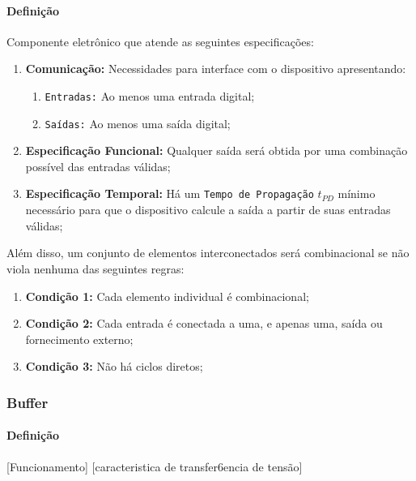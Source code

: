 \documentclass{article}
\begin{document}
            \paragraph{Definição}Componente eletrônico que atende as seguintes especificações:
                \begin{enumerate}[rightmargin = \leftmargin]
                    \item \textbf{Comunicação:} Necessidades para interface com o dispositivo apresentando:
                        \begin{enumerate}[noitemsep]
                            \item \texttt{Entradas:} Ao menos uma entrada digital;
                            \item \texttt{Saídas:} Ao menos uma saída digital;
                        \end{enumerate}

                    \item \textbf{Especificação Funcional:} Qualquer saída será obtida por uma combinação possível das entradas válidas;

                    \item \textbf{Especificação Temporal:} Há um \texttt{Tempo de Propagação} $t_{PD}$ mínimo necessário para que o dispositivo calcule a saída a partir de suas entradas válidas;
                \end{enumerate}
            Além disso, um conjunto de elementos interconectados será combinacional se não viola nenhuma das seguintes regras:
                \begin{enumerate}[noitemsep]
                    \item \textbf{Condição 1:} Cada elemento individual é combinacional;

                    \item \textbf{Condição 2:} Cada entrada é conectada a uma, e apenas uma, saída ou fornecimento externo;

                    \item \textbf{Condição 3:} Não há ciclos diretos;
                \end{enumerate}

        \subsubsection{Buffer}
            \paragraph{Definição}[Funcionamento] [caracteristica de transfer6encia de tensão]
\end{document}
